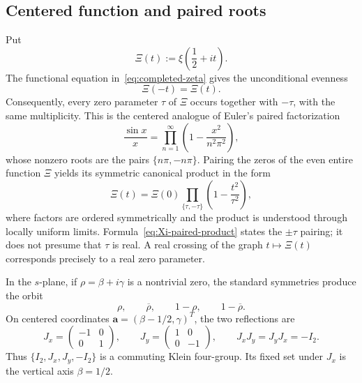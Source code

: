 \documentclass[11pt]{article}
\begin{document}
\subsection{Centered function and paired roots}
Put
\begin{equation}\label{eq:Xi-definition}
 \Xi(t):=\xi\!\left(\frac12+it\right).
\end{equation}
The functional equation in~\eqref{eq:completed-zeta} gives the unconditional evenness
\begin{equation}\label{eq:Xi-even}
 \Xi(-t)=\Xi(t).
\end{equation}
Consequently, every zero parameter $\tau$ of $\Xi$ occurs together with $-\tau$, with the
same multiplicity.  This is the centered analogue of Euler's paired factorization
\begin{equation}\label{eq:sine-paired-product}
 \frac{\sin x}{x}=\prod_{n=1}^{\infty}
 \left(1-\frac{x^2}{n^2\pi^2}\right),
\end{equation}
whose nonzero roots are the pairs $\{n\pi,-n\pi\}$.  Pairing the zeros of the even entire
function $\Xi$ yields its symmetric canonical product in the form
\begin{equation}\label{eq:Xi-paired-product}
 \Xi(t)=\Xi(0)\prod_{\{\tau,-\tau\}}
 \left(1-\frac{t^2}{\tau^2}\right),
\end{equation}
where factors are ordered symmetrically and the product is understood through locally uniform
limits.  Formula~\eqref{eq:Xi-paired-product} states the $\pm\tau$ pairing; it does not presume
that $\tau$ is real.  A real crossing of the graph $t\mapsto\Xi(t)$ corresponds precisely to a
real zero parameter.

In the $s$-plane, if $\rho=\beta+i\gamma$ is a nontrivial zero, the standard symmetries produce
the orbit
\begin{equation}\label{eq:zero-orbit}
 \rho,\qquad \overline\rho,\qquad 1-\rho,\qquad 1-\overline\rho.
\end{equation}
On centered coordinates $\mathbf a=(\beta-1/2,\gamma)^T$, the two reflections are
\begin{equation}\label{eq:klein-reflections}
 J_x=\begin{pmatrix}-1&0\\0&1\end{pmatrix},\qquad
 J_y=\begin{pmatrix}1&0\\0&-1\end{pmatrix},\qquad
 J_xJ_y=J_yJ_x=-I_2.
\end{equation}
Thus $\{I_2,J_x,J_y,-I_2\}$ is a commuting Klein four-group.  Its fixed set under $J_x$
is the vertical axis $\beta=1/2$.
\end{document}
